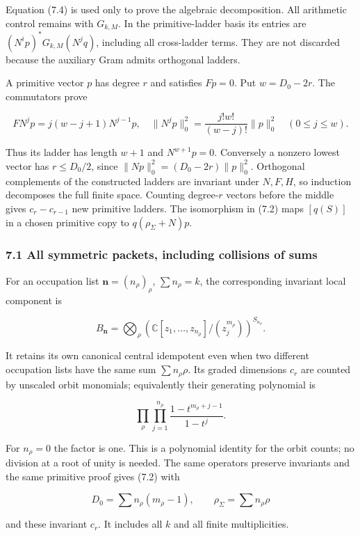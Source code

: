 Equation (7.4) is used only to prove the algebraic decomposition. All
arithmetic control remains with \(G_{k,M}\). In the primitive-ladder
basis its entries are \((N^ip)^*G_{k,M}(N^jq)\), including all
cross-ladder terms. They are not discarded because the auxiliary Gram
admits orthogonal ladders.

A primitive vector \(p\) has degree \(r\) and satisfies \(Fp=0\). Put
\(w=D_0-2r\). The commutators prove

\[FN^jp=j(w-j+1)N^{j-1}p,\quad
\|N^jp\|_0^2=\frac{j!w!}{(w-j)!}\|p\|_0^2\quad(0\le j\le w).\tag{7.5}\]

Thus its ladder has length \(w+1\) and \(N^{w+1}p=0\). Conversely a
nonzero lowest vector has \(r\le D_0/2\), since
\(\|Np\|_0^2=(D_0-2r)\|p\|_0^2\). Orthogonal complements of the
constructed ladders are invariant under \(N,F,H\), so induction
decomposes the full finite space. Counting degree-\(r\) vectors before
the middle gives \(c_r-c_{r-1}\) new primitive ladders. The isomorphism
in (7.2) maps \([q(S)]\) in a chosen primitive copy to
\(q(\rho_\Sigma+N)p\).

\subsubsection{7.1 All symmetric packets, including collisions of
sums}\label{spectral_sum_full:all-symmetric-packets-including-collisions-of-sums}

For an occupation list \(\mathbf n=(n_\rho)_\rho\), \(\sum n_\rho=k\),
the corresponding invariant local component is

\[B_{\mathbf n}=\bigotimes_\rho
\left(\mathbb C[z_1,\ldots,z_{n_\rho}]/(z_j^{m_\rho})\right)^{S_{n_\rho}}.\]

It retains its own canonical central idempotent even when two different
occupation lists have the same sum \(\sum n_\rho\rho\). Its graded
dimensions \(c_r\) are counted by unscaled orbit monomials; equivalently
their generating polynomial is

\[\prod_\rho\prod_{j=1}^{n_\rho}
\frac{1-t^{m_\rho+j-1}}{1-t^j}.\tag{7.6}\]

For \(n_\rho=0\) the factor is one. This is a polynomial identity for
the orbit counts; no division at a root of unity is needed. The same
operators preserve invariants and the same primitive proof gives (7.2)
with

\[D_0=\sum n_\rho(m_\rho-1),\qquad \rho_\Sigma=\sum n_\rho\rho\]

and these invariant \(c_r\). It includes all \(k\) and all finite
multiplicities.

